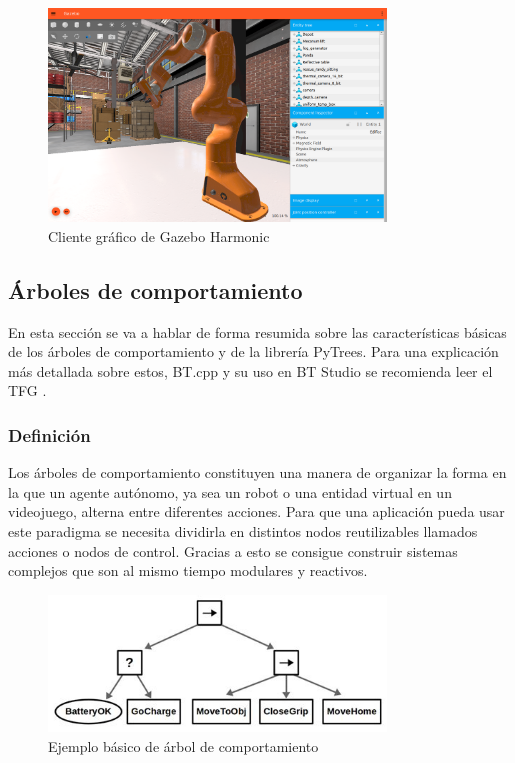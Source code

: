 \begin{figure}[H]
    \centering
    \includegraphics[width=0.8\textwidth]{figures/fundamentos/harmonic.png}
    \caption{Cliente gráfico de Gazebo Harmonic}
    \label{fig:ejemplo}
\end{figure}

\subsection{Árboles de comportamiento}

En esta sección se va a hablar de forma resumida sobre las características básicas de los árboles de comportamiento y de la librería PyTrees. Para una explicación más detallada sobre estos, BT.cpp y su uso en BT Studio se recomienda leer el TFG \cite{TFG_BT_Studio}.

\subsubsection{Definición}

Los árboles de comportamiento\cite{Colledanchise_2018} constituyen una manera de organizar la forma en la que un agente autónomo, ya sea un robot o una entidad virtual en un videojuego, alterna entre diferentes acciones. Para que una aplicación pueda usar este paradigma se necesita dividirla en distintos nodos reutilizables llamados acciones o nodos de control. Gracias a esto se consigue construir sistemas complejos que son al mismo tiempo modulares y reactivos.

\begin{figure}[H]
    \centering
    \includegraphics[width=0.8\textwidth]{figures/fundamentos/bt-example.png}
    \caption{Ejemplo básico de árbol de comportamiento}
    \label{fig:ejemplo}
\end{figure}

